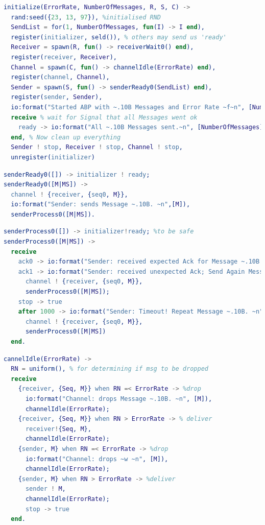 \documentclass[10pt]{article}
\begin{document}
  \begin{lstlisting}[language=erlang]
initialize(ErrorRate, NumberOfMessages, R, S, C) ->
  rand:seed({23, 13, 97}), %initialised RND
  SendList = for(1, NumberOfMessages, fun(I) -> I end),
  register(initializer, seld()), % others may send us 'ready'
  Receiver = spawn(R, fun() -> receiverWait0() end),
  register(receiver, Receiver),
  Channel = spawn(C, fun() -> channelIdle(ErrorRate) end),
  register(channel, Channel),
  Sender = spawn(S, fun() -> senderReady0(SendList) end),
  register(sender, Sender),
  io:format("Started ABP with ~.10B Messages and Error Rate ~f~n", [NumberOfMessages, ErrorRate]),
  receive % wait for Signal that all Messages went ok
    ready -> io:format("All ~.10B Messages sent.~n", [NumberOfMessages])
  end, % Now clean up everything
  Sender ! stop, Receiver ! stop, Channel ! stop,
  unregister(initializer)
\end{lstlisting}
  
  \begin{lstlisting}[language=erlang]
senderReady0([]) -> initializer ! ready;
senderReady0([M|MS]) ->
  channel ! {receiver, {seq0, M}},
  io:format("Sender: sends Message ~.10B. ~n",[M]),
  senderProcess0([M|MS]).
\end{lstlisting}
  
  \begin{lstlisting}[language=erlang]
senderProcess0([]) -> initializer!ready; %to be safe
senderProcess0([M|MS]) ->
  receive
    ack0 -> io:format("Sender: received expected Ack for Message ~.10B. ~n", [M]);
    ack1 -> io:format("Sender: received unexpected Ack; Send Again Message ~.10B.~n", [M]),
      channel ! {receiver, {seq0, M}},
      senderProcess0([M|MS]);
    stop -> true
    after 1000 -> io:format("Sender: Timeout! Repeat Message ~.10B. ~n", [M]),
      channel ! {receiver, {seq0, M}},
      senderProcess0([M|MS])
  end.
\end{lstlisting}
  
  \begin{lstlisting}[language=erlang]
cannelIdle(ErrorRate) ->
  RN = uniform(), % for determining if msg to be dropped
  receive
    {receiver, {Seq, M}} when RN =< ErrorRate -> %drop
      io:format("Channel: drops Message ~.10B. ~n", [M]),
      channelIdle(ErrorRate);
    {receiver, {Seq, M}} when RN > ErrorRate -> % deliver
      receiver!{Seq, M},
      channelIdle(ErrorRate);
    {sender, M} when RN =< ErrorRate -> %drop
      io:format("Channel: drops ~w ~n", [M]),
      channelIdle(ErrorRate);
    {sender, M} when RN > ErrorRate -> %deliver
      sender ! M,
      channelIdle(ErrorRate);
      stop -> true
  end.
\end{lstlisting}
  
\end{document}
